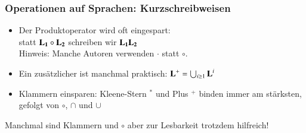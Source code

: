 \documentclass[onlymath]{beamer}
\begin{document}
\begin{frame}\frametitle{Operationen auf Sprachen: Kurzschreibweisen}

\begin{itemize}
\item Der Produktoperator wird oft eingespart:\\ statt $\textbf{\textcolor{black}{L}}_{\textbf{\textcolor{black}{1}}}\circ\textbf{\textcolor{black}{L}}_{\textbf{\textcolor{black}{2}}}$ schreiben wir $\textbf{\textcolor{black}{L}}_{\textbf{\textcolor{black}{1}}}\textbf{\textcolor{black}{L}}_{\textbf{\textcolor{black}{2}}}$\\
{\footnotesize\textcolor{devilscss}{Hinweis: Manche Autoren verwenden $\cdot$ statt $\circ$.}}
%
\item Ein zusätzlicher  ist manchmal praktisch: $\textbf{\textcolor{black}{L}}^+= \bigcup_{i\geq 1} \textbf{\textcolor{black}{L}}^i$
%
\item Klammern einsparen: Kleene-Stern $^*$ und Plus $^+$ binden immer am stärksten, gefolgt von $\circ$, $\cap$ und $\cup$
\end{itemize}

{\footnotesize Manchmal sind Klammern und $\circ$ aber zur Lesbarkeit trotzdem hilfreich!}
\bigskip
\pause



\end{frame}
\end{document}
